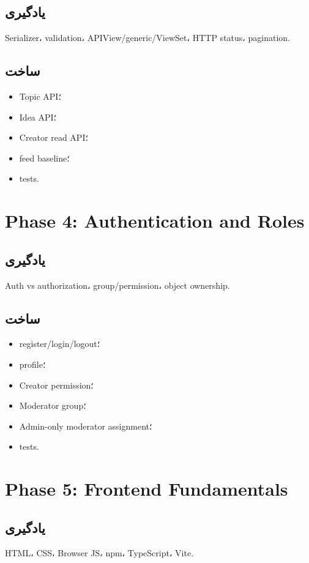 \subsection*{یادگیری}
Serializer، validation، APIView/generic/ViewSet، HTTP status، pagination.

\subsection*{ساخت}
\begin{itemize}
  \item Topic API؛
  \item Idea API؛
  \item Creator read API؛
  \item feed baseline؛
  \item tests.
\end{itemize}

\section{Phase 4: Authentication and Roles}

\subsection*{یادگیری}
Auth vs authorization، group/permission، object ownership.

\subsection*{ساخت}
\begin{itemize}
  \item register/login/logout؛
  \item profile؛
  \item Creator permission؛
  \item Moderator group؛
  \item Admin-only moderator assignment؛
  \item tests.
\end{itemize}

\section{Phase 5: Frontend Fundamentals}

\subsection*{یادگیری}
HTML، CSS، Browser JS، npm، TypeScript، Vite.

